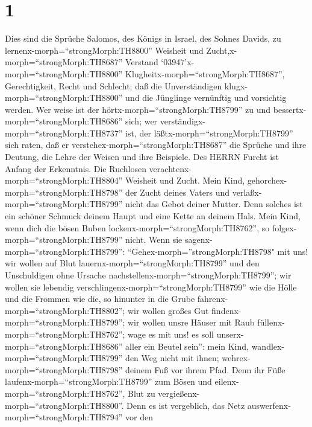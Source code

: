 \hypertarget{section}{%
\section{1}\label{section}}

 Dies sind die Sprüche Salomos, des Königs in Israel, des
Sohnes Davids,  zu lernenx-morph=``strongMorph:TH8800''
Weisheit und Zucht,x-morph=``strongMorph:TH8687'' Verstand 
`03947'\textbar x-morph=``strongMorph:TH8800''
Klugheitx-morph=``strongMorph:TH8687'', Gerechtigkeit, Recht und
Schlecht;  daß die Unverständigen
klugx-morph=``strongMorph:TH8800'' und die Jünglinge vernünftig und
vorsichtig werden.  Wer weise ist der
hörtx-morph=``strongMorph:TH8799'' zu und
bessertx-morph=``strongMorph:TH8686'' sich; wer
verständigx-morph=``strongMorph:TH8737'' ist, der
läßtx-morph=``strongMorph:TH8799'' sich raten,  daß er
verstehex-morph=``strongMorph:TH8687'' die Sprüche und ihre Deutung, die
Lehre der Weisen und ihre Beispiele.  Des HERRN Furcht ist
Anfang der Erkenntnis. Die Ruchlosen
verachtenx-morph=``strongMorph:TH8804'' Weisheit und Zucht. 
Mein Kind, gehorchex-morph=``strongMorph:TH8798'' der Zucht deines
Vaters und verlaßx-morph=``strongMorph:TH8799'' nicht das Gebot deiner
Mutter.  Denn solches ist ein schöner Schmuck deinem Haupt
und eine Kette an deinem Hals.  Mein Kind, wenn dich die
bösen Buben lockenx-morph=``strongMorph:TH8762'', so
folgex-morph=``strongMorph:TH8799'' nicht.  Wenn sie
sagenx-morph=``strongMorph:TH8799'': ``Gehex-morph=''strongMorph:TH8798"
mit uns! wir wollen auf Blut lauernx-morph=``strongMorph:TH8799'' und
den Unschuldigen ohne Ursache nachstellenx-morph=``strongMorph:TH8799'';
 wir wollen sie lebendig
verschlingenx-morph=``strongMorph:TH8799'' wie die Hölle und die Frommen
wie die, so hinunter in die Grube fahrenx-morph=``strongMorph:TH8802'';
 wir wollen großes Gut
findenx-morph=``strongMorph:TH8799''; wir wollen unsre Häuser mit Raub
füllenx-morph=``strongMorph:TH8762'';  wage es mit uns! es
soll unserx-morph=``strongMorph:TH8686'' aller ein Beutel sein'':
 mein Kind, wandlex-morph=``strongMorph:TH8799'' den Weg
nicht mit ihnen; wehrex-morph=``strongMorph:TH8798'' deinem Fuß vor
ihrem Pfad.  Denn ihr Füße
laufenx-morph=``strongMorph:TH8799'' zum Bösen und
eilenx-morph=``strongMorph:TH8762'', Blut zu
vergießenx-morph=``strongMorph:TH8800''.  Denn es ist
vergeblich, das Netz auswerfenx-morph=``strongMorph:TH8794'' vor den
